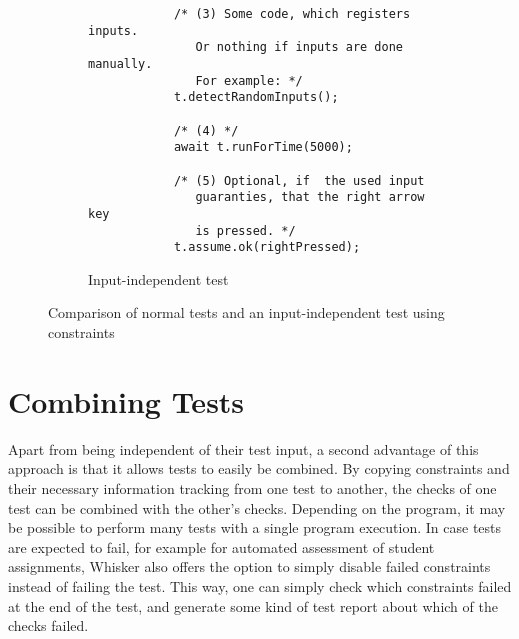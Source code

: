 \begin{figure}[h]
\begin{subfigure}[b]{.47\textwidth}
\begin{verbatim}
            /* (3) Some code, which registers inputs.
               Or nothing if inputs are done manually.
               For example: */
            t.detectRandomInputs();

            /* (4) */
            await t.runForTime(5000);

            /* (5) Optional, if  the used input
               guaranties, that the right arrow key
               is pressed. */
            t.assume.ok(rightPressed);
        \end{verbatim}
        \caption{Input-independent test}
    \end{subfigure}
    \caption{Comparison of normal tests and an input-independent test using constraints}
    \label{fig:normal-input-independet-test-comparison}
\end{figure}

\section{Combining Tests}

Apart from being independent of their test input, a second advantage of this approach is that it allows tests to easily be combined.
By copying constraints and their necessary information tracking from one test to another, the checks of one test can be combined with the other's checks.
Depending on the program, it may be possible to perform many tests with a single program execution.
In case tests are expected to fail, for example for automated assessment of student assignments,
Whisker also offers the option to simply disable failed constraints instead of failing the test.
This way, one can simply check which constraints failed at the end of the test, and generate some kind of test report about which of the checks failed.


